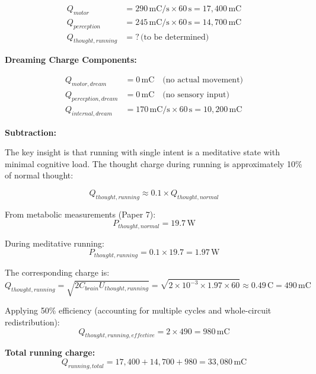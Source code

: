 \documentclass[12pt,a4paper]{article}
\begin{document}
\begin{align}
Q_{motor} &= 290 \, \text{mC/s} \times 60 \, \text{s} = 17{,}400 \, \text{mC} \\
Q_{perception} &= 245 \, \text{mC/s} \times 60 \, \text{s} = 14{,}700 \, \text{mC} \\
Q_{thought,running} &= ? \, \text{(to be determined)}
\end{align}

\textbf{Dreaming Charge Components:}

\begin{align}
Q_{motor,dream} &= 0 \, \text{mC} \quad \text{(no actual movement)} \\
Q_{perception,dream} &= 0 \, \text{mC} \quad \text{(no sensory input)} \\
Q_{internal,dream} &= 170 \, \text{mC/s} \times 60 \, \text{s} = 10{,}200 \, \text{mC}
\end{align}

\textbf{Subtraction:}

The key insight is that running with single intent is a meditative state with minimal cognitive load. The thought charge during running is approximately 10\% of normal thought:

\begin{equation}
Q_{thought,running} \approx 0.1 \times Q_{thought,normal}
\end{equation}

From metabolic measurements (Paper 7):
\begin{equation}
P_{thought,normal} = 19.7 \, \text{W}
\end{equation}

During meditative running:
\begin{equation}
P_{thought,running} = 0.1 \times 19.7 = 1.97 \, \text{W}
\end{equation}

The corresponding charge is:
\begin{equation}
Q_{thought,running} = \sqrt{2 C_{brain} U_{thought,running}} = \sqrt{2 \times 10^{-3} \times 1.97 \times 60} \approx 0.49 \, \text{C} = 490 \, \text{mC}
\end{equation}

Applying 50\% efficiency (accounting for multiple cycles and whole-circuit redistribution):
\begin{equation}
Q_{thought,running,effective} = 2 \times 490 = 980 \, \text{mC}
\end{equation}

\textbf{Total running charge:}
\begin{equation}
Q_{running,total} = 17{,}400 + 14{,}700 + 980 = 33{,}080 \, \text{mC}
\end{equation}
\end{document}
